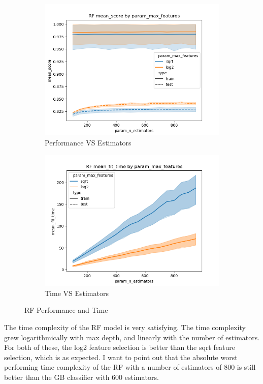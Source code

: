 \documentclass[12pt]{article}
\begin{document}
\begin{figure}
\begin{subfigure}{.5\textwidth}
    \includegraphics[width=.95\textwidth]{../results/rf/param_max_features_mean_score_param_n_estimators.png}
      \caption{Performance VS Estimators}
      \end{subfigure}%
  \begin{subfigure}{.5\textwidth}
    \includegraphics[width=.95\textwidth]{../results/rf/param_max_features_mean_fit_time_param_n_estimators.png}
    \caption{Time VS Estimators}
  \end{subfigure}
  \caption{RF Performance and Time}
  \label{figure3}
\end{figure}

The time complexity of the RF model is very satisfying. The time complexity grew logarithmically with max depth, and 
linearly with the number of estimators. For both of these, the log2 feature selection is better than the sqrt feature 
selection, which is as expected. I want to point out that the absolute worst performing time complexity of the RF with 
a number of estimators of 800 is still better than the GB classifier with 600 estimators.
\end{document}
